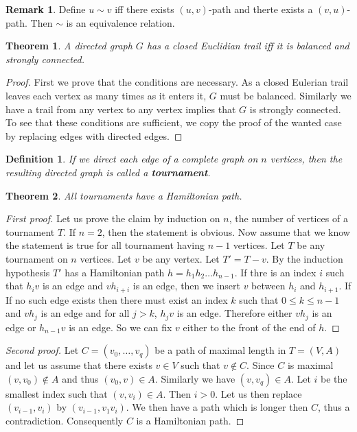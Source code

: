 \documentclass[12pt,a4paper]{article}
\newtheorem{thm}{Theorem}[section]
\newtheorem{defn}{Definition}[section]
\theoremstyle{definition}
\newtheorem{rem}{Remark}[section]
\begin{document}
\begin{rem} Define $u \sim v$ iff there exists $(u,v)$-path and therte exists a $(v,u)$-path. Then $\sim$ is an equivalence relation. 
\end{rem}
\begin{thm} A directed graph $G$ has a closed Euclidian trail iff it is balanced and strongly connected. 
\end{thm}
\begin{proof}
First we prove that the conditions are necessary. As a closed Eulerian trail leaves each vertex as many times as it enters it, $G$ must be balanced. Similarly we have a trail from any vertex to any vertex implies that $G$ is strongly connected. To see that these conditions are sufficient, we copy the proof of the wanted case by replacing edges with directed edges. 
\end{proof}
\begin{defn}If we direct each edge of a complete graph on $n$ vertices, then the resulting directed graph is called a \textbf{tournament}.
\end{defn}
\begin{thm} All tournaments have a Hamiltonian path. 
\end{thm}
\begin{proof}[First proof]
Let us prove the claim by induction on $n$, the number of vertices of a tournament $T$. If $n=2$, then the statement is obvious. Now assume that we know the statement is true for all tournament having $n-1$ vertices. Let $T$ be any tournament on $n$ vertices. Let $v$ be any vertex. Let $T'=T-v$. By the induction hypothesis $T'$ has a Hamiltonian path $h=h_1h_2 \dots h_{n-1}.$ If thre is an index $i$ such that $h_iv$ is an edge and $vh_{i+i}$ is an edge, then we insert $v$ between $h_i$ and $h_{i+1}$. If If no such edge exists then there must exist an index $k$ such that $0 \leq k \leq n-1$ and $vh_j$ is an edge and for all $j>k$, $h_j v$ is an edge. Therefore either $vh_j$ is an edge or $h_{n-1}v$ is an edge. So we can fix $v$ either to the front of the end of $h$. 
\end{proof}
\newpage
\begin{proof}[Second proof] Let $C=(v_0, \dots ,  v_q)$ be a path of maximal length in $T=(V,A)$ and let us assume that there exists $v \in V$ such that $v \notin C$. Since $C$ is maximal $(v,v_0) \notin A$ and thus $(v_0,v) \in A$. Similarly we have $(v,v_q) \in A$. Let $i$ be the smallest index such that $(v,v_i) \in A$. Then $i>0$. Let us then replace $(v_{i-1},v_i)$ by $(v_{i-1},v_1v_i)$. We then have a path which is longer then $C$,  thus a contradiction. Consequently $C$ is a Hamiltonian path. 
\end{proof}
\end{document}
